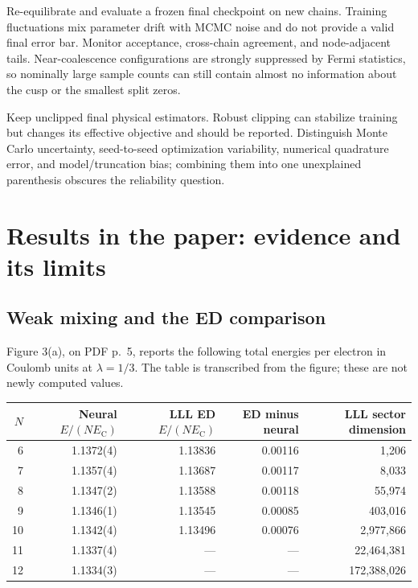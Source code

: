 \documentclass[11pt,letterpaper]{article}
\newcommand{\EC}{E_{\mathrm C}}
\begin{document}
Re-equilibrate and evaluate a frozen final checkpoint on new chains. Training fluctuations mix parameter drift with MCMC noise and do not provide a valid final error bar. Monitor acceptance, cross-chain agreement, and node-adjacent tails. Near-coalescence configurations are strongly suppressed by Fermi statistics, so nominally large sample counts can still contain almost no information about the cusp or the smallest split zeros.

Keep unclipped final physical estimators. Robust clipping can stabilize training but changes its effective objective and should be reported. Distinguish Monte Carlo uncertainty, seed-to-seed optimization variability, numerical quadrature error, and model/truncation bias; combining them into one unexplained parenthesis obscures the reliability question.

\section{Results in the paper: evidence and its limits}
\label{sec:results}

\subsection{Weak mixing and the ED comparison}

Figure 3(a), on PDF p.~5, reports the following total energies per electron in Coulomb units at $\lambda=1/3$. The table is transcribed from the figure; these are not newly computed values.

\begin{center}
\begin{tabular}{rrrrr}
\toprule
$N$ & Neural $E/(N\EC)$ & LLL ED $E/(N\EC)$ & ED minus neural & LLL sector dimension\\
\midrule
6 & 1.1372(4) & 1.13836 & 0.00116 & 1,206\\
7 & 1.1357(4) & 1.13687 & 0.00117 & 8,033\\
8 & 1.1347(2) & 1.13588 & 0.00118 & 55,974\\
9 & 1.1346(1) & 1.13545 & 0.00085 & 403,016\\
10 & 1.1342(4) & 1.13496 & 0.00076 & 2,977,866\\
11 & 1.1337(4) & --- & --- & 22,464,381\\
12 & 1.1334(3) & --- & --- & 172,388,026\\
\bottomrule
\end{tabular}
\end{center}
\end{document}
